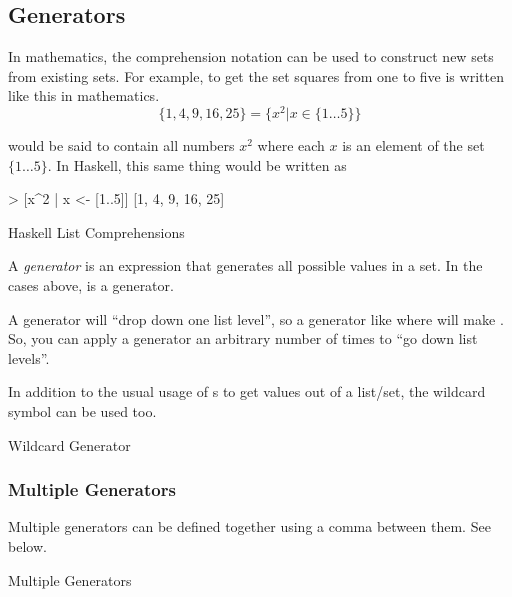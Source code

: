 \subsection{Generators}\label{subsec:Generators}
In mathematics, the comprehension notation can be used to construct new sets from existing sets.
For example, to get the set squares from one to five is written like this in mathematics.
\begin{equation}\label{eq:Generator}
  \lbrace 1, 4, 9, 16, 25 \rbrace = \bigl\lbrace x^{2} \vert x \in \lbrace 1 \ldots 5 \rbrace \bigr\rbrace
\end{equation}

 would be said to contain all numbers $x^{2}$ where each $x$ is an element of the set $\lbrace 1 \ldots 5 \rbrace$.
In Haskell, this same thing would be written as
\begin{listing}[h!tbp]
\begin{haskellsource}
> [x^2 | x <- [1..5]]
[1, 4, 9, 16, 25]
\end{haskellsource}
\caption{Haskell List Comprehensions}
\label{lst:List_Comprehension}
\end{listing}

\begin{definition}[Generator]\label{def:Generator}
  A \emph{generator} is an expression that generates all possible values in a set.
  In the cases above,  is a generator.

  A generator will ``drop down one list level'', so a generator like  where  will make .
  So, you can apply a generator an arbitrary number of times to ``go down list levels''.
\end{definition}

In addition to the usual usage of s to get values out of a list/set, the wildcard symbol \haskellinline{_} can be used too.
\begin{listing}[h!tbp]
\caption{Wildcard Generator}
\label{lst:Wildcard_Generator}
\end{listing}

\subsubsection{Multiple Generators}\label{subsubsec:Multiple_Generators}
Multiple generators can be defined together using a comma between them.
See  below.
\begin{listing}[h!tbp]
\caption{Multiple Generators}
\label{lst:Multiple_Generators}
\end{listing}

